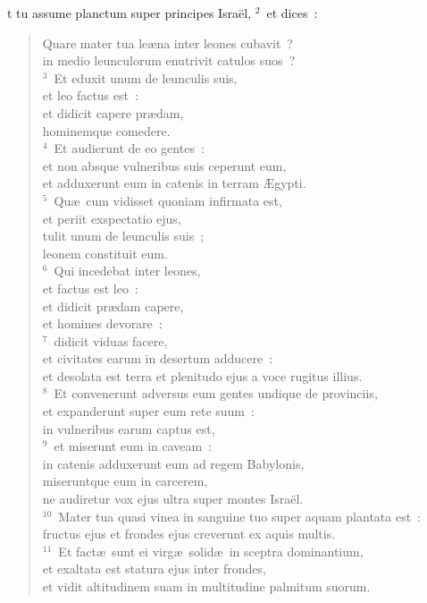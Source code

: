 \bchapter
{}t tu assume planctum super principes Isra\"el,
${}^{2}$~et dices~: \begin{verse}Quare mater tua le\ae na inter leones cubavit~?\\ in medio leunculorum enutrivit catulos suos~?\\
${}^{3}$~Et eduxit unum de leunculis suis,\\ et leo factus est~:\\ et didicit capere pr\ae dam,\\ hominemque comedere.\\
${}^{4}$~Et audierunt de eo gentes~:\\ et non absque vulneribus suis ceperunt eum,\\ et adduxerunt eum in catenis in terram \AE gypti.\\
${}^{5}$~Qu\ae\ cum vidisset quoniam infirmata est,\\ et periit exspectatio ejus,\\ tulit unum de leunculis suis~;\\ leonem constituit eum.\\
${}^{6}$~Qui incedebat inter leones,\\ et factus est leo~:\\ et didicit pr\ae dam capere,\\ et homines devorare~:\\
${}^{7}$~didicit viduas facere,\\ et civitates earum in desertum adducere~:\\ et desolata est terra et plenitudo ejus a voce rugitus illius.\\
${}^{8}$~Et convenerunt adversus eum gentes undique de provinciis,\\ et expanderunt super eum rete suum~:\\ in vulneribus earum captus est,\\
${}^{9}$~et miserunt eum in caveam~:\\ in catenis adduxerunt eum ad regem Babylonis,\\ miseruntque eum in carcerem,\\ ne audiretur vox ejus ultra super montes Isra\"el.\\
${}^{10}$~Mater tua quasi vinea in sanguine tuo super aquam plantata est~:\\ fructus ejus et frondes ejus creverunt ex aquis multis.\\
${}^{11}$~Et fact\ae\ sunt ei virg\ae\ solid\ae\ in sceptra dominantium,\\ et exaltata est statura ejus inter frondes,\\ et vidit altitudinem suam in multitudine palmitum suorum.\\

\end{verse}
